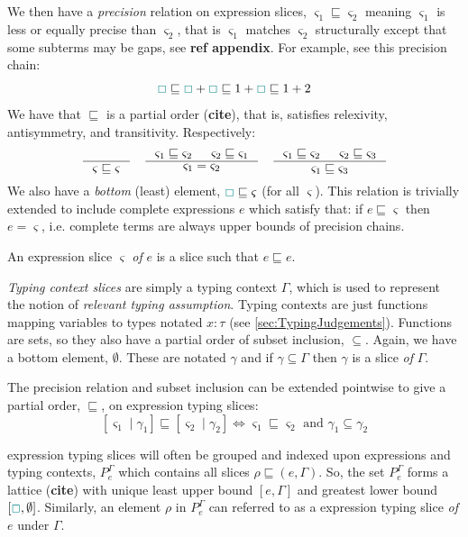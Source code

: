 We then have a \textit{precision} relation on expression slices, $\varsigma_1 \sqsubseteq \varsigma_2$ meaning $\varsigma_1$ is less or equally precise than $\varsigma_2$, that is $\varsigma_1$ matches $\varsigma_2$ structurally except that some subterms may be gaps, see \textbf{ref appendix}. For example, see this precision chain:
\[{\color{teal}\Box} \sqsubseteq{\color{teal}\Box} + {\color{teal}\Box}\sqsubseteq 1 + {\color{teal}\Box} \sqsubseteq 1 + 2\]
We have that $\sqsubseteq$ is a partial order (\textbf{cite}), that is, satisfies relexivity, antisymmetry, and transitivity. Respectively:
\[\inference{}{\varsigma \sqsubseteq \varsigma} \quad \inference{\varsigma_1 \sqsubseteq \varsigma_2 & \varsigma_2 \sqsubseteq \varsigma_1}{\varsigma_1 = \varsigma_2} \quad \inference{\varsigma_1 \sqsubseteq \varsigma_2 & \varsigma_2 \sqsubseteq \varsigma_3}{\varsigma_1 \sqsubseteq \varsigma_3}\]
We also have a \textit{bottom} (least) element, ${\color{teal}\Box} \sqsubseteq \varsigma$ (for all $\varsigma$). This relation is trivially extended to include complete expressions $e$ which satisfy that: if $e \sqsubseteq \varsigma$ then $e = \varsigma$, i.e. complete terms are always upper bounds of precision chains.

An expression slice $\varsigma$ \textit{of} $e$ is a slice such that $e \sqsubseteq e$.

\textit{Typing context slices} are simply a typing context $\Gamma$, which is used to represent the notion of \textit{relevant typing assumption}. Typing contexts are just functions mapping variables to types notated $x : \tau$ (see \cref{sec:TypingJudgements}). Functions are sets, so they also have a partial order of subset inclusion, $\subseteq$. Again, we have a bottom element, $\emptyset$.  These are notated $\gamma$ and if $\gamma \subseteq \Gamma$ then $\gamma$ is a slice \textit{of} $\Gamma$.

The precision relation and subset inclusion can be extended pointwise to give a partial order, $\sqsubseteq$, on expression typing slices:
\[[\varsigma_1\mid \gamma_1] \sqsubseteq [\varsigma_2\mid \gamma_2] \iff  \varsigma_1 \sqsubseteq \varsigma_2 \text{ and } \gamma_1 \subseteq \gamma_2\]

expression typing slices will often be grouped and indexed upon expressions and typing contexts, $P_e^{\Gamma}$ which contains all slices $\rho \sqsubseteq (e, \Gamma)$. So, the set $P_e^{\Gamma}$ forms a lattice (\textbf{cite}) with unique least upper bound $[e, \Gamma]$ and greatest lower bound $[{\color{teal}\Box}, \emptyset]$. Similarly, an element $\rho$ in $P_e^{\Gamma}$ can referred to as a expression typing slice \textit{of} $e$ under $\Gamma$.
